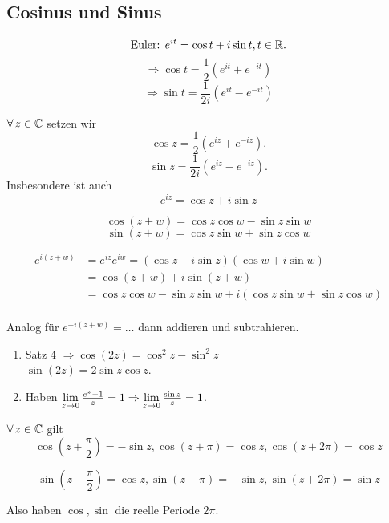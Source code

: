 \documentclass[../ana2.tex]{subfiles}
\begin{document}
\subsection*{Cosinus und Sinus}
\[ \text{Euler: } e^{it} = \cos t + i \sin t, t\in\mathbb{R}. \]
\[ \Rightarrow \cos t = \frac{1}{2}(e^{it} + e^{-it}) \]
\[ \Rightarrow \sin t = \frac{1}{2i}(e^{it} - e^{-it}) \]
\begin{defi}
    \( \forall z\in\C \) setzen wir 
    \[ \cos z = \frac{1}{2} (e^{iz} + e^{-iz}). \]
    \[ \sin z = \frac{1}{2i} (e^{iz} - e^{-iz}). \]
    Insbesondere ist auch 
    \[ e^{iz} = \cos z + i \sin z \]
\end{defi}
\begin{satz}[Additionstheoreme]
    \[ \cos(z+w) = \cos z \cos w - \sin z \sin w \]
    \[ \sin(z+w) = \cos z \sin w + \sin z \cos w \]
\end{satz}
\begin{bew}
    \begin{align*}
        e^{i(z+w)} &= e^{iz} e^{iw} = (\cos z + i \sin z)(\cos w + i \sin w) \\
        &= \cos (z+w) + i \sin(z+w) \\
        &= \cos z \cos w - \sin z \sin w + i(\cos z \sin w + \sin z \cos w) \\
    \end{align*}

    Analog für \( e^{-i (z + w)} = \ldots \) 
    dann addieren und subtrahieren.
\end{bew}
\begin{bem}
    \begin{enumerate}
        \item Satz 4 \( \Rightarrow \cos(2z) 
        = \cos^2 z - \sin^2 z \) \\
        \( \sin(2z) = 2 \sin z \cos z \).
        \item Haben \( \lim\limits_{z\rightarrow{}0} \frac{e^z - 1}{z} = 1 
        \Rightarrow \lim\limits_{z\rightarrow{}0} \frac{\sin z}{z} = 1 \).
    \end{enumerate}
\end{bem}
\begin{kor}
    \( \forall z \in \C \) gilt 
    \[ \cos \left( z+\frac{\pi}{2}\right) = -\sin z, \cos (z + \pi) 
    = \cos z, \cos(z + 2\pi) = \cos z \]
    
    \[ \sin\left(z + \frac{\pi}{2}\right) = \cos z, 
    \sin(z + \pi) = -\sin z, \sin(z + 2\pi) = \sin z \]
\end{kor}
\begin{bem}
    Also haben \( \cos, \sin \) die reelle Periode \( 2\pi \).
\end{bem}
\end{document}
